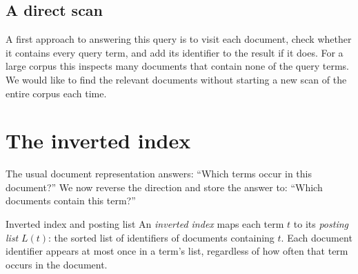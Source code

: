\documentclass[a4paper,12pt,oneside]{report}
\begin{document}
\subsection{A direct scan}

A first approach to answering this query is to visit each document,
check whether it contains every query term, and add its identifier
to the result if it does.
For a large corpus this inspects many documents that contain none of
the query terms. We would like to find the relevant documents without
starting a new scan of the entire corpus each time.

\section{The inverted index}

The usual document representation answers: ``Which terms occur in
this document?'' We now reverse the direction and store the answer
to: ``Which documents contain this term?''

\begin{frameddefn}{Inverted index and posting list}\label{def:inverted-index}
An \emph{inverted index} maps each term $t$ to its \emph{posting list}
$L(t)$: the sorted list of identifiers of documents containing $t$.
Each document identifier appears at most once in a term's list,
regardless of how often that term occurs in the document.
\end{frameddefn}
\end{document}
